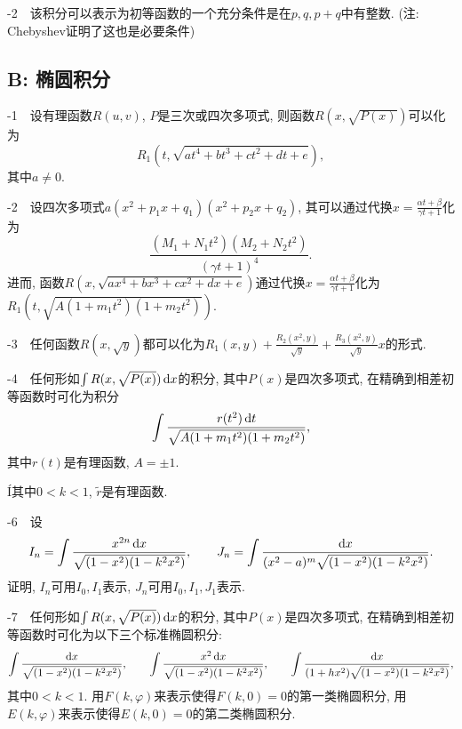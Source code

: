 -2~~该积分可以表示为初等函数的一个充分条件是在$p,q,p+q$中有整数. (注: Chebyshev证明了这也是必要条件)



\subsection*{B: 椭圆积分}

-1~~设有理函数$R(u,v)$, $P$是三次或四次多项式, 则函数$R(x,\sqrt{P(x)})$可以化为$$R_1(t, \sqrt{at^4+bt^3+ct^2+dt+e}),$$其中$a \neq 0$. 
\vspace{1em}

-2~~设四次多项式$a(x^2+p_1x+q_1)(x^2+p_2x+q_2)$, 其可以通过代换$x=\frac{\alpha t+\beta}{\gamma t+1}$化为$$\dfrac{(M_1+N_1t^2)(M_2+N_2t^2)}{(\gamma t+1)^{4}} .$$
进而, 函数$R(x,\sqrt{ax^4+bx^3+cx^2+dx+e})$通过代换$x=\frac{\alpha t+\beta}{\gamma t+1}$化为$R_1(t,\sqrt{A(1+m_1t^2)(1+m_2t^2)})$. 
\vspace{1em}

-3~~任何函数$R(x,\sqrt{y})$都可以化为$R_1(x,y)+\frac{R_2(x^2,y)}{\sqrt{y}}+\frac{R_3(x^2,y)}{\sqrt{y}}x$的形式. 
\vspace{1em}

-4~~任何形如$\int R(x,\sqrt{P(x)}) \mathop{}\!\mathrm{d} x$的积分, 其中$P(x)$是四次多项式, 在精确到相差初等函数时可化为积分$$\int \frac{r(t^2) \mathop{}\!\mathrm{d} t}{\sqrt{A(1+m_1t^2)(1+m_2t^2)}} ,$$
其中$r(t)$是有理函数, $A=\pm 1$. 
\vspace{1em}

Í其中$0<k<1$, $\tilde{r}$是有理函数. 
\vspace{1em}

-6~~设$$I_n=\int \frac{x^{2n} \mathop{}\!\mathrm{d} x}{\sqrt{(1-x^2)(1-k^2x^2)}},\qquad J_n = \int \frac{\mathop{}\!\mathrm{d} x}{(x^2-a)^m\sqrt{(1-x^2)(1-k^2x^2)}}.$$
证明, $I_n$可用$I_0,I_1$表示, $J_n$可用$I_0,I_1,J_1$表示. 
\vspace{1em}

-7~~任何形如$\int R(x,\sqrt{P(x)}) \mathop{}\!\mathrm{d} x$的积分, 其中$P(x)$是四次多项式, 在精确到相差初等函数时可化为以下三个标准椭圆积分: $$\int \frac{\mathop{}\!\mathrm{d} x}{\sqrt{(1-x^2)(1-k^2x^2)}} ,\qquad \int \frac{x^2\mathop{}\!\mathrm{d} x}{\sqrt{(1-x^2)(1-k^2x^2)}},\qquad \int \frac{\mathop{}\!\mathrm{d} x}{(1+hx^2)\sqrt{(1-x^2)(1-k^2x^2)}},$$
其中$0<k<1$. 用$F(k,\varphi)$来表示使得$F(k,0)=0$的第一类椭圆积分, 用$E(k,\varphi)$来表示使得$E(k,0)=0$的第二类椭圆积分. 
\vspace{1em}







